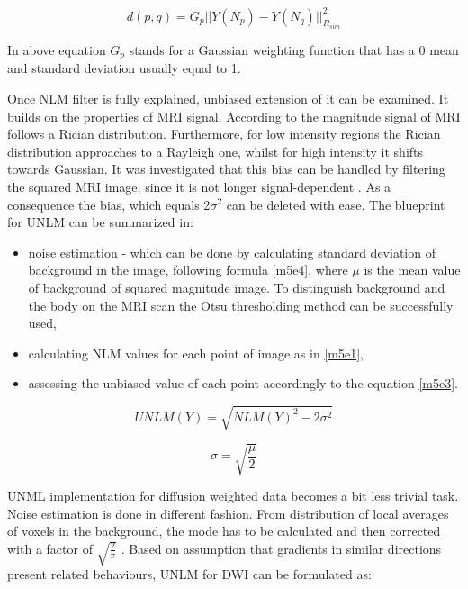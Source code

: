 \begin{equation}
d(p,q)=G_{p}||Y(N_{p})-Y(N_{q})||_{R_{sim}}^{2}\label{m5e6}
\end{equation}

In above equation $G_{p}$ stands for a Gaussian weighting function
that has a 0 mean and standard deviation usually equal to 1.

Once NLM filter is fully explained, unbiased extension of it can be
examined. It builds on the properties of MRI signal. According to
\cite{5a1} the magnitude signal of MRI follows a Rician distribution.
Furthermore, for low intensity regions the Rician distribution approaches
to a Rayleigh one, whilst for high intensity it shifts towards Gaussian.
It was investigated that this bias can be handled by filtering the
squared MRI image, since it is not longer signal-dependent \cite{5a1}.
As a consequence the bias, which equals 2$\sigma^{2}$ \cite{5a3}
can be deleted with ease. The blueprint for UNLM can be summarized
in:
\begin{itemize}
\item noise estimation - which can be done by calculating standard deviation
of background in the image, following formula \ref{m5e4}, where $\mu$
is the mean value of background of squared magnitude image. To distinguish
background and the body on the MRI scan the Otsu thresholding method
\cite{5a4} can be successfully used, 
\item calculating NLM values for each point of image as in \ref{m5e1}, 
\item assessing the unbiased value of each point accordingly to the equation
\ref{m5e3}.
\end{itemize}
\begin{equation}
UNLM(Y)=\sqrt{NLM(Y)^{2}-2\sigma^{2}}\label{m5e3}
\end{equation}

\begin{equation}
\sigma=\sqrt{\frac{\mu}{2}}\label{m5e4}
\end{equation}

UNML implementation for diffusion weighted data becomes a bit less
trivial task. Noise estimation is done in different fashion. From
distribution of local averages of voxels in the background, the mode
has to be calculated and then corrected with a factor of $\sqrt{\frac{2}{\pi}}$
\cite{5a2}. Based on assumption that gradients in similar directions
present related behaviours, UNLM for DWI can be formulated as:


